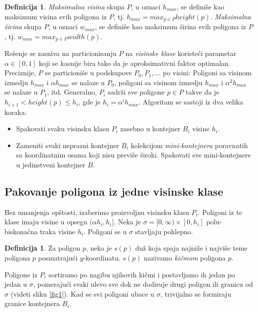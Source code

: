 \documentclass[a4paper]{article}
\theoremstyle{plain}
\theoremstyle{definition}
\newtheorem{defn}[thm]{Definicija} %
\begin{document}
\begin{defn}
    \emph{Maksimalna visina} skupa $P$, u oznaci \emph{$h_{max}$}, se defini\v{s}e kao maksimum visina svih poligona iz $P$, tj. $h_{max} = max_{p \in P}height(p)$. \emph{Maksimalna \v{s}irina} skupa $P$, u oznaci \emph{$w_{max}$}, se defini\v{s}e kao maksimum \v{s}irina svih poligona iz $P$, tj. $w_{max} = max_{p \in P}width(p)$. 
\end{defn}

Re\v{s}enje se zasniva na particionisanju $P$ na \emph{visinske klase} koriste\'c{}i parametar $\alpha \in [0, 1]$ koji se kasnije bira tako da je aproksimativni faktor optimalan. Preciznije, $P$ se particioni\v{s}e u podskupove $P_{0}, P_{1}, \dots$ po visini: Poligoni sa visinom izmedju $h_{max}$ i $\alpha h_{max}$ se nalaze u $P_{0}$, poligoni sa visinom izmedju $h_{max}$ i $\alpha^{2} h_{max}$ se nalaze u $P_{1}$, itd. Generalno, $P_{i}$ sadr\v{z}i sve poligone $p \in P$ takve da je $h_{i+1} < height(p) \leq h_{i}$, gde je $h_{i} = \alpha^{i}h_{max}$. Algoritam se sastoji iz dva velika koraka:
\begin{itemize}
    \item Spakovati svaku visinsku klasu $P_{i}$ zasebno u kontejner $B_{i}$ visine $h_{i}$.
    \item Zameniti svaki neprazni kontejner $B_{i}$ kolekcijom \emph{mini-kontejnera} poravnatih sa koordinatnim osama koji nisu previ\v{s}e \v{s}iroki. Spakovati sve mini-kontejnere u jedinstveni kontejner $B$.
\end{itemize}


\subsection{Pakovanje poligona iz jedne visinske klase}
\label{subsec:Korak1}

Bez umanjenja op\v{s}tosti, izaberimo proizvoljnu visinsku klasu $P_{i}$. Poligoni iz te klase imaju visine u opsegu $(\alpha h_{i}, h_{i}]$. Neka je $\sigma = [0, \infty) \times [0, h_{i}]$ polu-biskona\v{c}na traka visine $h_{i}$. Poligoni se u $\sigma$ stavljaju pohlepno.

\begin{defn}
    Za poligon $p$, neka je $s(p)$ du\v{z} koja spaja najni\v{z}e i najvi\v{s}e teme poligona $p$ posmatraju\'c{}i $y$-koordinatu. $s(p)$ nazivamo \emph{ki\v{c}mom} poligona $p$.
\end{defn}

Poligone iz $P_{i}$ sortiramo po nagibu njihovih ki\v{c}mi i postavljamo ih jedan po jedan u $\sigma$, pomeraju\'c{}i svaki ulevo sve dok ne dodiruje drugi poligon ili granicu od $\sigma$ (videti sliku \ref{fig1}). Kad se svi poligoni ubace u $\sigma$, trivijalno se formiraju granice kontejnera $B_{i}$.
\end{document}
